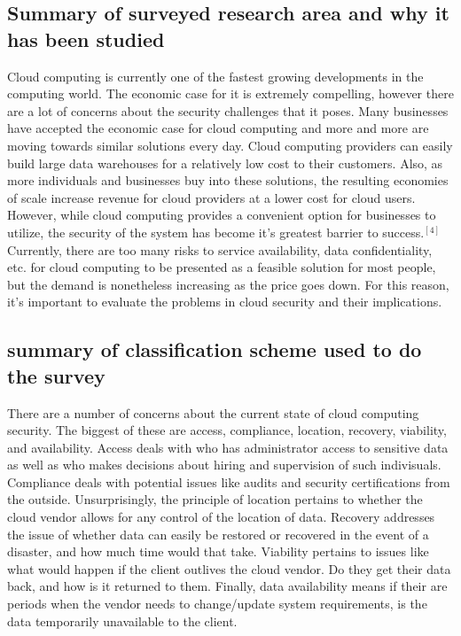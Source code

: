 \documentclass[a4paper, 8pt]{article} %
\begin{document}
\begin{doublespacing}
\subsection*{Summary of surveyed research area and why it has been studied}
Cloud computing is currently one of the fastest growing developments in the computing world.  The economic case for it is extremely compelling, however there are a lot of concerns about the security challenges that it poses.  Many businesses have accepted the economic case for cloud computing and more and more are moving towards similar solutions every day.  Cloud computing providers can easily build large data warehouses for a relatively low cost to their customers.  Also, as more individuals and businesses buy into these solutions, the resulting economies of scale increase revenue for cloud providers at a lower cost for cloud users.  However, while cloud computing provides a convenient option for businesses to utilize, the security of the system has become it's greatest barrier to success.$^{[4]}$  Currently, there are too many risks to service availability, data confidentiality, etc. for cloud computing to be presented as a feasible solution for most people, but the demand is nonetheless increasing as the price goes down.  For this reason, it's important to evaluate the problems in cloud security and their implications.  

\subsection*{summary of classification scheme used to do the survey}

There are a number of concerns about the current state of cloud computing security.  The biggest of these are access, compliance, location, recovery, viability, and availability.  Access deals with who has administrator access to sensitive data as well as who makes decisions about hiring and supervision of such indivisuals.  Compliance deals with potential issues like audits and security certifications from the outside.  Unsurprisingly, the principle of location pertains to whether the cloud vendor allows for any control of the location of data.  Recovery addresses the issue of whether data can easily be restored or recovered in the event of a disaster, and how much time would that take.  Viability pertains to issues like what would happen if the client outlives the cloud vendor.  Do they get their data back, and how is it returned to them.  Finally, data availability means if their are periods when the vendor needs to change/update system requirements, is the data temporarily unavailable to the client.  


\end{doublespacing}
\end{document}
